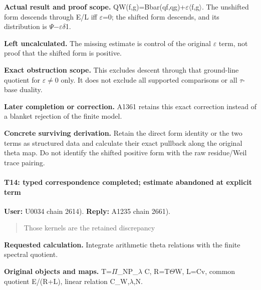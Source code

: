 \textbf{Actual result and proof scope.}
QW(f,g)=Bbar(qf,qg)+\allowbreak{}\ensuremath{ε}\allowbreak{}\allowbreak{}\ensuremath{\langle}\allowbreak{}f,g\allowbreak{}\ensuremath{\rangle}\allowbreak{}.
The unshifted form descends through E/L iff
\allowbreak{}\ensuremath{ε}\allowbreak{}=0; the shifted form descends,
and its distribution is
\allowbreak{}\ensuremath{Ψ}\allowbreak{}\allowbreak{}\ensuremath{−}\allowbreak{}\allowbreak{}\ensuremath{ε}\allowbreak{}\allowbreak{}\ensuremath{δ}\allowbreak{}1.

\textbf{Left uncalculated.} The missing estimate is control of the
original \allowbreak{}\ensuremath{ε}\allowbreak{} term, not proof that
the shifted form is positive.

\textbf{Exact obstruction scope.} This excludes descent through that
ground-line quotient for
\allowbreak{}\ensuremath{ε}\allowbreak{}\allowbreak{}\ensuremath{≠}\allowbreak{}0
only. It does not exclude all supported comparisons or all
\allowbreak{}\ensuremath{τ}\allowbreak{}-base duality.

\textbf{Later completion or correction.} A1361 retains this exact
correction instead of a blanket rejection of the finite model.

\textbf{Concrete surviving derivation.} Retain the direct form identity
or the two terms as structured data and calculate their exact pullback
along the original theta map. Do not identify the shifted positive form
with the raw residue/Weil trace pairing.

\paragraph{T14: typed correspondence completed; estimate abandoned at
explicit
term}\label{t14-typed-correspondence-completed-estimate-abandoned-at-explicit-term}

\textbf{User:} U0034
\protect{} chain 2614).
\textbf{Reply:} A1235
\protect{} chain 2661).

\begin{quote}
Those kernels are the retained discrepancy
\end{quote}

\textbf{Requested calculation.} Integrate arithmetic theta relations
with the finite spectral quotient.

\textbf{Original objects and maps.}
T=\allowbreak{}\ensuremath{Π}\allowbreak{}\_NP\_\allowbreak{}\ensuremath{λ}\allowbreak{}
C, R=T\allowbreak{}\ensuremath{Θ}\allowbreak{}W, L=Cv, common quotient
E/(R+L), linear relation
C\_W,\allowbreak{}\ensuremath{λ}\allowbreak{},N.

